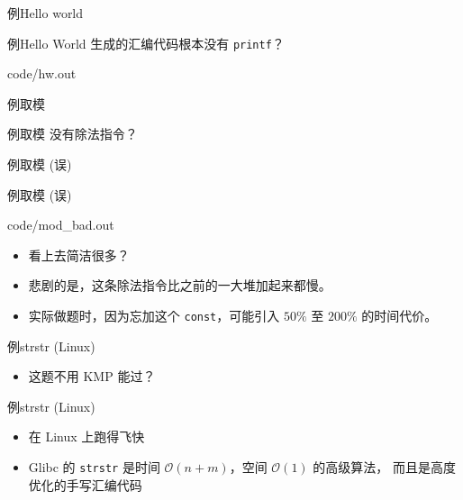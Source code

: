 \documentclass[10pt,mathserif]{beamer}
\newcommand{\lstcode}[1] {  }
\newcommand{\lstterm}[1] {  }
\begin{document}
\begin{frame}[fragile]{例}{Hello world}
	\lstcode{hw.cc}
\end{frame}

\begin{frame}[fragile]{例}{Hello World}
	生成的汇编代码根本没有 \texttt{printf}？
	
	{code/hw.out}
\end{frame}

\begin{frame}[fragile]{例}{取模}
	\lstcode{mod.cc}
\end{frame}

\begin{frame}[fragile]{例}{取模}
	没有除法指令？
	\lstterm{mod.out}
\end{frame}

\begin{frame}[fragile]{例}{取模 (误)}
	\lstcode{mod_bad.cc}
\end{frame}

\begin{frame}[fragile]{例}{取模 (误)}
	
	{code/mod_bad.out}
	\begin{itemize}
		\item 看上去简洁很多？
		\item 悲剧的是，这条除法指令比之前的一大堆加起来都慢。
		\item 实际做题时，因为忘加这个 \texttt{const}，可能引入
			$50\%$ 至 $200\%$ 的时间代价。
	\end{itemize}
\end{frame}

\begin{frame}[fragile]{例}{strstr (Linux)}
	\lstcode{strstr.cc}
	\begin{itemize}
		\item 这题不用 KMP 能过？
	\end{itemize}
\end{frame}

\begin{frame}[fragile]{例}{strstr (Linux)}
	\lstterm{strstr.out}
	\begin{itemize}
		\item 在 Linux 上跑得飞快
		\item Glibc 的 \lstinline{strstr} 是时间
			$\mathcal{O}(n + m)$，空间 $\mathcal{O}(1)$ 的高级算法，
			而且是高度优化的手写汇编代码
	\end{itemize}
\end{frame}
\end{document}
